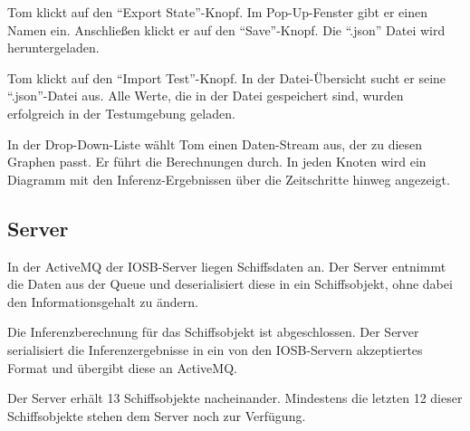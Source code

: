 \documentclass[parskip=full,11pt,twoside]{scrartcl}
\begin{document}
{Tom klickt auf den \enquote{Export State}-Knopf. Im Pop-Up-Fenster gibt er einen Namen ein.
Anschließen klickt er auf den
\enquote{Save}-Knopf.}
{Die \enquote{.json} Datei wird heruntergeladen.}

{Tom klickt auf den \enquote{Import Test}-Knopf. In der Datei-Übersicht sucht er seine \enquote{.json}-Datei aus.}
{Alle Werte, die in der Datei gespeichert sind, wurden erfolgreich in der Testumgebung geladen.}

{In der Drop-Down-Liste wählt Tom einen Daten-Stream aus, der zu diesen Graphen passt.
Er führt die Berechnungen durch.}
{In jeden Knoten wird ein Diagramm mit den Inferenz-Ergebnissen über die Zeitschritte hinweg angezeigt.} %

\subsection{Server}


{In der ActiveMQ der IOSB-Server liegen Schiffsdaten an.}
{Der Server entnimmt die Daten aus der Queue und deserialisiert diese in ein Schiffsobjekt, ohne dabei den Informationsgehalt zu ändern.}

{Die Inferenzberechnung für das Schiffsobjekt ist abgeschlossen.}
{Der Server serialisiert die Inferenzergebnisse in ein von den IOSB-Servern akzeptiertes Format und übergibt diese an ActiveMQ.}



{Der Server erhält 13 Schiffsobjekte nacheinander.}
{Mindestens die letzten 12 dieser Schiffsobjekte stehen dem Server noch zur Verfügung.}


\end{document}
